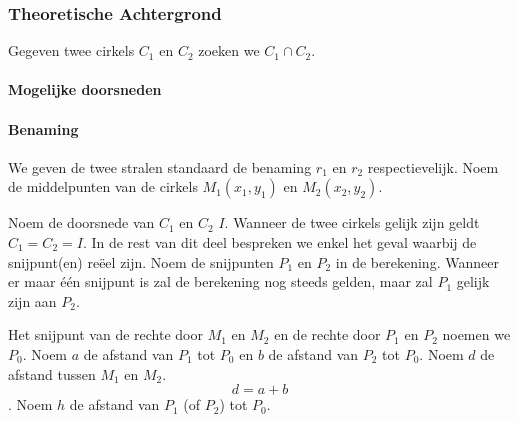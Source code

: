 \subsubsection{Theoretische Achtergrond}
\begin{figure}[H]

\end{figure}

Gegeven twee cirkels $C_1$ en $C_2$ zoeken we $C_1 \cap C_2$.


\paragraph{Mogelijke doorsneden}

\paragraph{Benaming}
We geven de twee stralen standaard de benaming $r_1$ en $r_2$ respectievelijk.
Noem de middelpunten van de cirkels $M_1(x_1,y_1)$ en $M_2(x_2,y_2)$. 

Noem de doorsnede van $C_1$ en $C_2$ $I$. Wanneer de twee cirkels gelijk zijn geldt $C_1 = C_2 = I$.
In de rest van dit deel bespreken we enkel het geval waarbij de snijpunt(en) re\"eel zijn.
Noem de snijpunten $P_1$ en $P_2$ in de berekening.
Wanneer er maar \'e\'en snijpunt is zal de berekening nog steeds gelden, maar zal $P_1$ gelijk zijn aan $P_2$.

Het snijpunt van de rechte door $M_1$ en $M_2$ en de rechte door $P_1$ en $P_2$ noemen we $P_0$.
Noem $a$ de afstand van $P_1$ tot $P_0$ en $b$ de afstand van $P_2$ tot $P_0$.
Noem $d$ de afstand tussen $M_1$ en $M_2$.
\[
d = a + b
\]
.
Noem $h$ de afstand van $P_1$ (of $P_2$) tot $P_0$.

